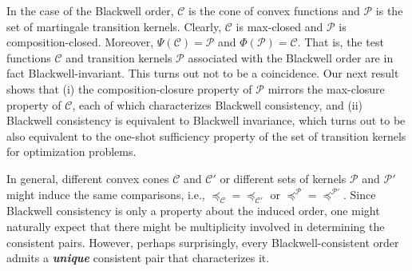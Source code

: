 \documentclass[12pt,letterpaper]{article}
\newenvironment{original}{\color{black}}{}
\theoremstyle{plain}
\theoremstyle{definition}
\theoremstyle{remark}
\newcommand{\Pc}{\mathcal{P}}
\newcommand{\C}{\mathcal{C}}
\theoremstyle{definition}
\begin{document}
\begin{original}
In the case of the Blackwell order, $\C$ is the cone of convex functions and $\Pc$ is the set of martingale transition kernels. Clearly, $\C$ is max-closed and $\Pc$ is composition-closed. Moreover, $\Psi(\mathcal{C}) = \Pc$ and  $\Phi(\Pc) = \mathcal{C}$. That is, the test functions $\C$ and transition kernels $\Pc$ associated with the Blackwell order are in fact Blackwell-invariant. This turns out not to be a coincidence. Our next result shows that (i) the composition-closure property of $\Pc$ mirrors the max-closure property of $\C$, each of which characterizes Blackwell consistency, and (ii) Blackwell consistency is equivalent to Blackwell invariance, which turns out to be also equivalent to the one-shot sufficiency property of the set of transition kernels for optimization problems.

In general, different convex cones $\C$ and $\C'$ or different sets of kernels $\Pc$ and $\Pc'$ might induce the same comparisons, i.e., $\preceq_\C=\preceq_{\C'}$ or $\preceq^{\Pc}=\preceq^{\Pc'}$. Since Blackwell consistency is only a property about the induced order, one might naturally expect that there might be multiplicity involved in determining the consistent pairs. However, perhaps surprisingly, every Blackwell-consistent order admits a \textit{\textbf{unique}} consistent pair that characterizes it.
\end{original}
\end{document}

